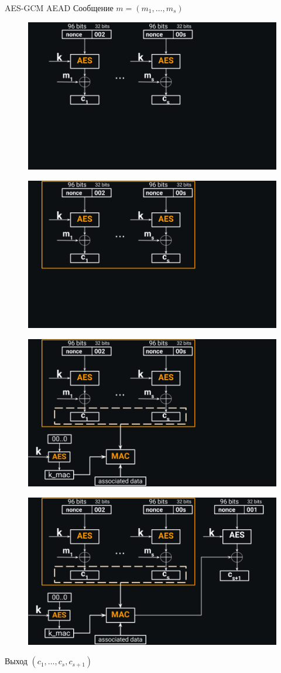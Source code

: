 \documentclass[usenames,dvipsnames,8pt,aspectratio=169]{beamer}
\begin{document}
\begin{frame}{AES-GCM AEAD}
\Large Сообщение $m=(m_1, \ldots, m_s)$
{
\begin{figure}
	\includegraphics[width=0.7\linewidth]{AES_GCM_AEAD_1}
\end{figure}
}
{
\begin{figure}
	\includegraphics[width=0.7\linewidth]{AES_GCM_AEAD_2}
\end{figure}
}
{
\begin{figure}
	\includegraphics[width=0.7\linewidth]{AES_GCM_AEAD_3}
\end{figure}
}
{
\begin{figure}
	\includegraphics[width=0.7\linewidth]{AES_GCM_AEAD_full}
\end{figure}
Выход $(c_1, \ldots, c_s, c_{s+1})$
}
\end{frame}
\end{document}
